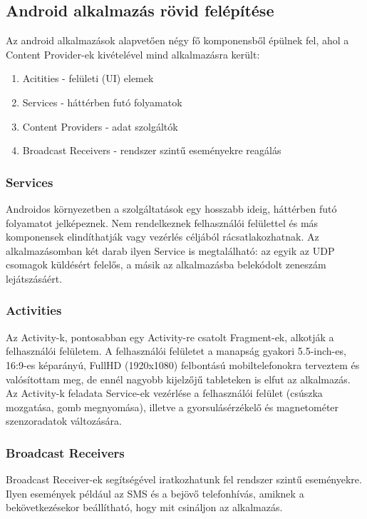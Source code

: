 \documentclass[../main.tex]{subfiles}
\begin{document}
    \subsection{Android alkalmazás rövid felépítése} %
        Az android alkalmazások alapvetően négy fő komponensből épülnek fel, ahol a Content Provider-ek kivételével mind alkalmazásra került\cite{android_app_fund}:
        \begin{enumerate}
            \item Acitities - felületi (UI) elemek
            \item Services - háttérben futó folyamatok
            \item Content Providers - adat szolgáltók
            \item Broadcast Receivers - rendszer szintű eseményekre reagálás
        \end{enumerate}
        
        \subsubsection{Services}
            Androidos környezetben a szolgáltatások egy hosszabb ideig, háttérben futó folyamatot jelképeznek. Nem rendelkeznek felhasználói felülettel és más komponensek elindíthatják vagy vezérlés céljából rácsatlakozhatnak. Az alkalmazásomban két darab ilyen Service is megtalálható: az egyik az UDP csomagok küldésért felelős, a másik az alkalmazásba belekódolt zeneszám lejátszásáért.
        
        \subsubsection{Activities}
            Az Activity-k, pontosabban egy Activity-re csatolt Fragment-ek, alkotják a felhasználói felületem. A felhasználói felületet a manapság gyakori 5.5-inch-es, 16:9-es képarányú, FullHD (1920x1080) felbontású mobiltelefonokra terveztem és valósítottam meg, de ennél nagyobb kijelzőjű tableteken is elfut az alkalmazás. Az Activity-k feladata Service-ek vezérlése a felhasználói felület (csúszka mozgatása, gomb megnyomása), illetve a gyorsulásérzékelő és magnetométer szenzoradatok változására. 
            
        \subsubsection{Broadcast Receivers}
            Broadcast Receiver-ek segítségével iratkozhatunk fel rendszer szintű eseményekre. Ilyen események például az SMS és a bejövő telefonhívás, amiknek a bekövetkezésekor beállítható, hogy mit csináljon az alkalmazás. 
    
\end{document}
